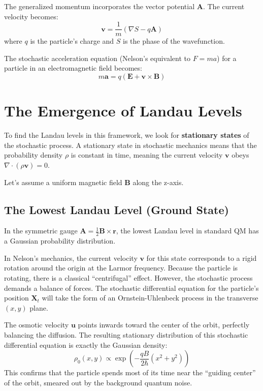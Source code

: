 \documentclass[12pt]{article}
\begin{document}
The generalized momentum incorporates the vector potential $\mathbf{A}$. The current velocity becomes:
\begin{equation}
\mathbf{v} = \frac{1}{m}(\nabla S - q\mathbf{A})
\end{equation}
where $q$ is the particle's charge and $S$ is the phase of the wavefunction.

The stochastic acceleration equation (Nelson's equivalent to $F=ma$) for a particle in an electromagnetic field becomes:
\begin{equation}
m \mathbf{a} = q(\mathbf{E} + \mathbf{v} \times \mathbf{B})
\end{equation}

\section{The Emergence of Landau Levels}
To find the Landau levels in this framework, we look for \textbf{stationary states} of the stochastic process. A stationary state in stochastic mechanics means that the probability density $\rho$ is constant in time, meaning the current velocity $\mathbf{v}$ obeys $\nabla \cdot (\rho \mathbf{v}) = 0$.

Let's assume a uniform magnetic field $\mathbf{B}$ along the z-axis. 

\subsection{The Lowest Landau Level (Ground State)}
In the symmetric gauge $\mathbf{A} = \frac{1}{2}\mathbf{B} \times \mathbf{r}$, the lowest Landau level in standard QM has a Gaussian probability distribution. 

In Nelson's mechanics, the current velocity $\mathbf{v}$ for this state corresponds to a rigid rotation around the origin at the Larmor frequency. Because the particle is rotating, there is a classical ``centrifugal'' effect. However, the stochastic process demands a balance of forces. The stochastic differential equation for the particle's position $\mathbf{X}_t$ will take the form of an Ornstein-Uhlenbeck process in the transverse $(x,y)$ plane. 

The osmotic velocity $\mathbf{u}$ points inwards toward the center of the orbit, perfectly balancing the diffusion. The resulting stationary distribution of this stochastic differential equation is exactly the Gaussian density:
\begin{equation}
\rho_0(x,y) \propto \exp\left(-\frac{qB}{2\hbar}(x^2 + y^2)\right)
\end{equation}
This confirms that the particle spends most of its time near the ``guiding center'' of the orbit, smeared out by the background quantum noise.
\end{document}
